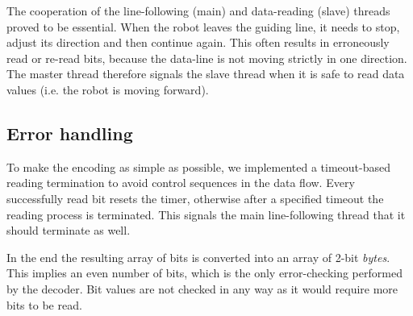 The cooperation of the line-following (main) and data-reading (slave) threads
proved to be essential. When the robot leaves the guiding line, it needs
to stop, adjust its direction and then continue again.
This often results in erroneously read or re-read bits, because the
data-line is not moving strictly in one direction. The master thread
therefore signals the slave thread when it is safe to read data values
(i.e. the robot is moving forward).

\subsection{Error handling}
To make the encoding as simple as possible, we implemented a
timeout-based reading termination to avoid control sequences in the data
flow. Every successfully read bit resets the timer, otherwise after
a specified timeout the reading process is terminated. This signals
the main line-following thread that it should terminate as well.

In the end the resulting array of bits is converted into an array of
2-bit \textit{bytes}. This implies an even number of bits, which is the
only error-checking performed by the decoder. Bit values are not checked
in any way as it would require more bits to be read.

